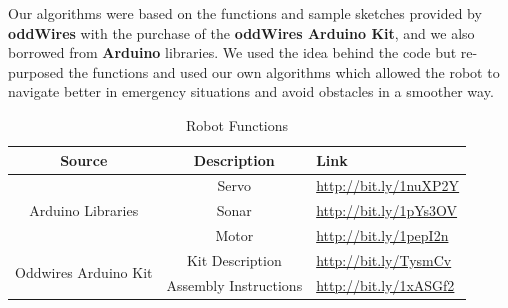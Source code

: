 \documentclass[11pt]{article}
\begin{document}
Our algorithms were based on the functions and sample sketches provided by \textbf{oddWires}  with the purchase of the \textbf{oddWires Arduino Kit}, and we also borrowed from \textbf{Arduino} libraries.
We used the idea behind the code but re-purposed the functions and used our own algorithms which allowed the robot to navigate better in emergency situations and avoid obstacles in a smoother way. 
	\begin {table}[h]
	\begin {center} 
	\vspace{15pt}
	
	\begin{tabular}{||c|c|l||}\hline	
		\textbf{Source}	&	\textbf{Description}	&	\textbf{Link}		\\\hline
		\multirow{3}{*}{Arduino Libraries}
						&	Servo		&	\url{http://bit.ly/1nuXP2Y} 		\\
						&	Sonar		&	\url{http://bit.ly/1pYs3OV} 		\\
						&	Motor		&	\url{http://bit.ly/1pepI2n}	 	\\\hline
		\multirow{2}{*}{Oddwires Arduino Kit}
						&	Kit Description		&	 \url{http://bit.ly/TysmCv} \\
					&	Assembly Instructions		&	\url{http://bit.ly/1xASGf2} \\\hline

	\end{tabular}
		\caption {Robot Functions} \label{refs}
	\end{center}
	\end{table} 	
\end{document}
